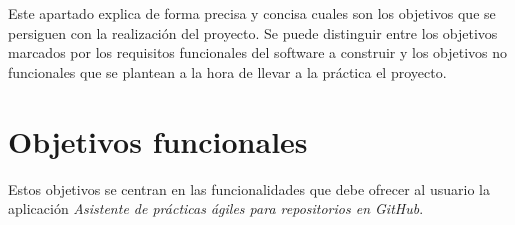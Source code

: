  \label{sec:objetivos}

Este apartado explica de forma precisa y concisa cuales son los objetivos que se persiguen con la realización del proyecto. Se puede distinguir entre los objetivos marcados por los requisitos funcionales del software a construir y los objetivos no funcionales que se plantean a la hora de llevar a la práctica el proyecto.

\section{Objetivos funcionales}

Estos objetivos se centran en las funcionalidades que debe ofrecer al usuario la aplicación \textit{Asistente de prácticas ágiles para repositorios en GitHub}.

